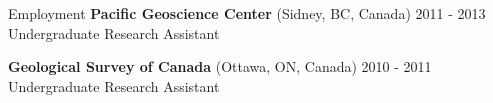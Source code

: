 \begin{rSection}{Employment}
	\textbf{Pacific Geoscience Center} (Sidney, BC, Canada) \hfill 2011 - 2013\\
	Undergraduate Research Assistant
	\smallbreak
	
	\textbf{Geological Survey of Canada} (Ottawa, ON, Canada) \hfill 2010 - 2011\\
	Undergraduate Research Assistant
\end{rSection}